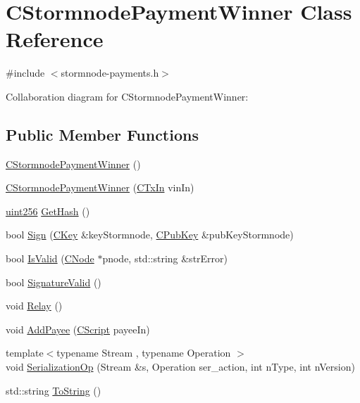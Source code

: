\hypertarget{class_c_stormnode_payment_winner}{}\section{C\+Stormnode\+Payment\+Winner Class Reference}
\label{class_c_stormnode_payment_winner}


{\ttfamily \#include $<$stormnode-\/payments.\+h$>$}



Collaboration diagram for C\+Stormnode\+Payment\+Winner\+:
\subsection*{Public Member Functions}
\begin{DoxyCompactItemize}
\item 
\hyperlink{class_c_stormnode_payment_winner_ae71317a423305ca67c8d97e12bb07f74}{C\+Stormnode\+Payment\+Winner} ()
\item 
\hyperlink{class_c_stormnode_payment_winner_ada5f637e455e6afe3d6a6fdfef424cfa}{C\+Stormnode\+Payment\+Winner} (\hyperlink{class_c_tx_in}{C\+Tx\+In} vin\+In)
\item 
\hyperlink{classuint256}{uint256} \hyperlink{class_c_stormnode_payment_winner_a7ef2cef7bb1dfcd12d7fe7abb15c5802}{Get\+Hash} ()
\item 
bool \hyperlink{class_c_stormnode_payment_winner_a2ee621a52030230a8e3307886f5f45be}{Sign} (\hyperlink{class_c_key}{C\+Key} \&key\+Stormnode, \hyperlink{class_c_pub_key}{C\+Pub\+Key} \&pub\+Key\+Stormnode)
\item 
bool \hyperlink{class_c_stormnode_payment_winner_ae8e5cecfd1f95eed8fdd14f019360fa0}{Is\+Valid} (\hyperlink{class_c_node}{C\+Node} $\ast$pnode, std\+::string \&str\+Error)
\item 
bool \hyperlink{class_c_stormnode_payment_winner_a7c86a0fbc7e6fb5f6e07a0248ed04a43}{Signature\+Valid} ()
\item 
void \hyperlink{class_c_stormnode_payment_winner_a39a19ceedef26c1b54d44853450a71eb}{Relay} ()
\item 
void \hyperlink{class_c_stormnode_payment_winner_ac1b332eb97519047fa170e53af4287e3}{Add\+Payee} (\hyperlink{class_c_script}{C\+Script} payee\+In)
\item 
{\footnotesize template$<$typename Stream , typename Operation $>$ }\\void \hyperlink{class_c_stormnode_payment_winner_a049f6ab099e6521be3a670523d7ac6fd}{Serialization\+Op} (Stream \&s, Operation ser\+\_\+action, int n\+Type, int n\+Version)
\item 
std\+::string \hyperlink{class_c_stormnode_payment_winner_a8e1f36dc03395e3b0468ca51acdd790d}{To\+String} ()
\end{DoxyCompactItemize}
